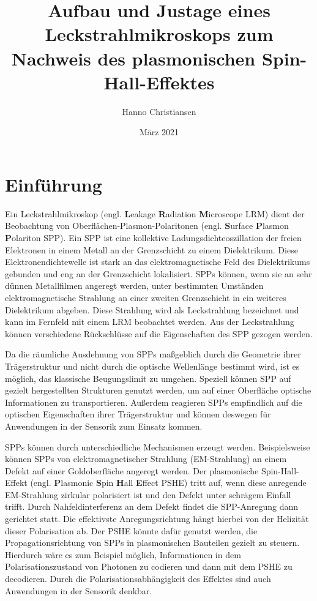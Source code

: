 \documentclass[titlepage,  ngerman]{article}
\title{Aufbau und Justage eines Leckstrahlmikroskops zum Nachweis des plasmonischen Spin-Hall-Effektes}
\author{Hanno Christiansen}
\date{März 2021}
\begin{document}
	\sloppy
	
	
	\tableofcontents
	\newpage
	\listoffigures 
	\newpage
	
	\section{Einführung}
	Ein Leckstrahlmikroskop (engl. \textbf{L}eakage \textbf{R}adiation \textbf{M}icroscope LRM) dient der Beobachtung von Oberflächen-Plasmon-Polaritonen (engl. \textbf{S}urface \textbf{P}lasmon \textbf{P}olariton SPP). Ein SPP ist eine kollektive Ladungsdichteoszillation der freien Elektronen in einem Metall an der Grenzschicht zu einem Dielektrikum. Diese Elektronendichtewelle ist stark an das elektromagnetische Feld des Dielektrikums gebunden und eng an der Grenzschicht lokalisiert. SPPs können, wenn sie an sehr dünnen Metallfilmen angeregt werden, unter bestimmten Umständen elektromagnetische Strahlung an einer zweiten Grenzschicht in ein weiteres Dielektrikum abgeben. Diese Strahlung wird als Leckstrahlung bezeichnet und kann im Fernfeld mit einem LRM beobachtet werden. Aus der Leckstrahlung können verschiedene Rückschlüsse auf die Eigenschaften des SPP gezogen werden.\cite{Drezet.2008}
	
	Da die räumliche Ausdehnung von SPPs maßgeblich durch die Geometrie ihrer Trägerstruktur und nicht durch die optische Wellenlänge bestimmt wird, ist es möglich, das klassische Beugungslimit zu umgehen. Speziell können SPP auf gezielt hergestellten Strukturen genutzt werden, um auf einer Oberfläche optische Informationen zu transportieren. Außerdem reagieren SPPs empfindlich auf die optischen Eigenschaften ihrer Trägerstruktur und können deswegen für Anwendungen in der Sensorik zum Einsatz kommen.\cite{Lin.2013}
	
	SPPs können durch unterschiedliche Mechanismen erzeugt werden. Beispielsweise können SPPs von elektromagnetischer Strahlung (EM-Strahlung) an einem Defekt auf einer Goldoberfläche angeregt werden. Der plasmonische Spin-Hall-Effekt (engl. \textbf{P}lasmonic \textbf{S}pin \textbf{H}all \textbf{E}ffect PSHE) tritt auf, wenn diese anregende EM-Strahlung zirkular polarisiert ist und den Defekt unter schrägem Einfall trifft. Durch Nahfeldinterferenz an dem Defekt findet die SPP-Anregung dann gerichtet statt. Die effektivste Anregungsrichtung hängt hierbei von der Helizität dieser Polarisation ab. Der PSHE könnte dafür genutzt werden, die Propagationsrichtung von SPPs in plasmonischen Bauteilen gezielt zu steuern. Hierdurch wäre es zum Beispiel möglich, Informationen in dem Polarisationszustand von Photonen zu codieren und dann mit dem PSHE zu decodieren. Durch die Polarisationsabhängigkeit des Effektes sind auch Anwendungen in der Sensorik denkbar.\cite{RodriguezFortuno.2013}
	
\end{document}
